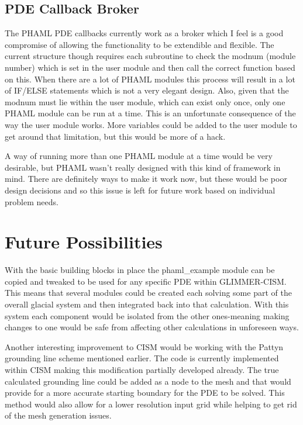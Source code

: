 \subsection{PDE Callback Broker}
The PHAML PDE callbacks currently work as a broker which I feel is a good compromise of allowing the functionality to be extendible and flexible.  The current structure though requires each subroutine to check the modnum (module number) which is set in the user module and then call the correct function based on this.  When there are a lot of PHAML modules this process will result in a lot of IF/ELSE statements which is not a very elegant design.  Also, given that the modnum must lie within the user module, which can exist only once, only one PHAML module can be run at a time.  This is an unfortunate consequence of the way the user module works.  More variables could be added to the user module to get around that limitation, but this would be more of a hack.  

A way of running more than one PHAML module at a time would be very desirable, but PHAML wasn't really designed with this kind of framework in mind.  There are definitely ways to make it work now, but these would be poor design decisions and so this issue is left for future work based on individual problem needs.

\section{Future Possibilities}\label{sec:chp6poss}

With the basic building blocks in place the phaml\_example module can be copied and tweaked to be used for any specific PDE within GLIMMER-CISM.  This means that several modules could be created each solving some part of the overall glacial system and then integrated back into that calculation.  With this system each component would be isolated from the other ones-meaning making changes to one would be safe from affecting other calculations in unforeseen ways.

Another interesting improvement to CISM would be working with the Pattyn grounding line scheme mentioned earlier.\citep{Pattyn2006JGR}  The code is currently implemented within CISM making this modification partially developed already.  The true calculated grounding line could be added as a node to the mesh and that would provide for a more accurate starting boundary for the PDE to be solved.  This method would also allow for a lower resolution input grid while helping to get rid of the mesh generation issues.

